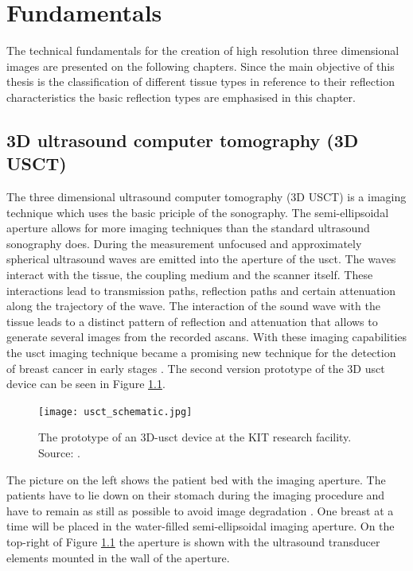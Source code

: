 \chapter{Fundamentals}
\label{chap:mathFund}

The technical fundamentals for the creation of high resolution three dimensional images are presented on the following chapters. Since the main objective of this thesis is the classification of different tissue types in reference to their reflection characteristics the basic reflection types are emphasised in this chapter. 

\section{3D ultrasound computer tomography (3D USCT)}
The three dimensional ultrasound computer tomography (3D USCT) is a imaging technique which uses the basic priciple of the sonography. The semi-ellipsoidal aperture allows for more imaging techniques than the standard ultrasound sonography does. During the measurement unfocused and approximately spherical ultrasound waves are emitted into the aperture of the \ac{usct}. The waves interact with the tissue, the coupling medium and the scanner itself. These interactions lead to transmission paths, reflection paths and certain attenuation along the trajectory of the wave. The interaction of the sound wave with the tissue leads to a distinct pattern of reflection and attenuation that allows to generate several images from the recorded \acp{ascan}.
With these imaging capabilities the \ac{usct} imaging technique became a promising new technique for the detection of breast cancer in early stages \cite{Ruiter2011RealizationUSCT}. The second version prototype of the 3D \ac{usct} device can be seen in Figure \ref{usct_example}.

\begin{figure}[H]
    \centering
    \texttt{[image: usct\_schematic.jpg]}
    \caption{The prototype of an 3D-\ac{usct} device at the KIT research facility. Source: \cite{Kretzek2014GPUAberration}. }
    \label{usct_example}
\end{figure}


 The picture on the left shows the patient bed with the imaging aperture. The patients have to lie down on their stomach during the imaging procedure and have to remain as still as possible to avoid image degradation \cite{Ruiter2011RealizationUSCT}. One breast at a time will be placed in the water-filled semi-ellipsoidal imaging aperture. On the top-right of Figure \ref{usct_example} the aperture is shown with the ultrasound transducer elements mounted in the wall of the aperture.

